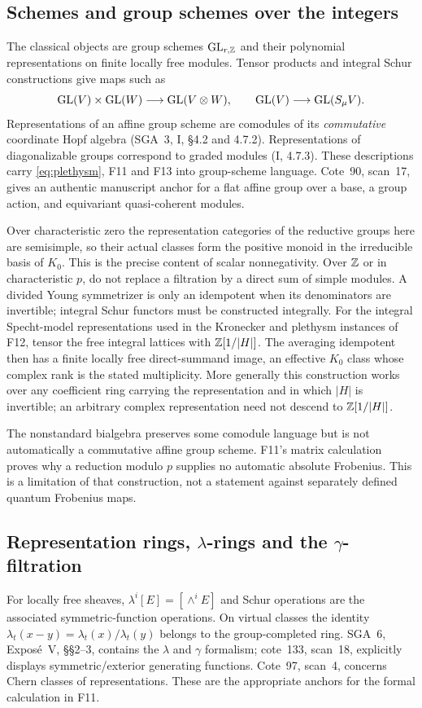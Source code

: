 \documentclass[11pt,a4paper]{article}
\newcommand{\fid}[1]{\textsf{#1}}\newcommand{\gate}[1]{\textsf{#1}}
\theoremstyle{named}\newtheorem{finding}{Finding}[section]
\theoremstyle{definition}\newtheorem{definition}[finding]{Definition}
\theoremstyle{remark}\newtheorem{remark}[finding]{Remark}
\begin{document}
\subsection{Schemes and group schemes over the integers}
The classical objects are group schemes $\mathrm{GL}_{r,\mathbb Z}$ and their polynomial representations on finite locally free modules. Tensor products and integral Schur constructions give maps such as
\[
 \mathrm{GL}(V)\times\mathrm{GL}(W)\longrightarrow\mathrm{GL}(V\otimes W),\qquad
 \mathrm{GL}(V)\longrightarrow\mathrm{GL}(S_\mu V).
\]
Representations of an affine group scheme are comodules of its \emph{commutative} coordinate Hopf algebra (SGA~3, I, \S4.2 and 4.7.2). Representations of diagonalizable groups correspond to graded modules (I, 4.7.3). These descriptions carry \eqref{eq:plethysm}, \fid{F11} and \fid{F13} into group-scheme language. Cote~90, scan~17, gives an authentic manuscript anchor for a flat affine group over a base, a group action, and equivariant quasi-coherent modules.

Over characteristic zero the representation categories of the reductive groups here are semisimple, so their actual classes form the positive monoid in the irreducible basis of $K_0$. This is the precise content of scalar nonnegativity. Over $\mathbb Z$ or in characteristic $p$, do not replace a filtration by a direct sum of simple modules. A divided Young symmetrizer is only an idempotent when its denominators are invertible; integral Schur functors must be constructed integrally. For the integral Specht-model representations used in the Kronecker and plethysm instances of \fid{F12}, tensor the free integral lattices with $\mathbb Z[1/|H|]$. The averaging idempotent then has a finite locally free direct-summand image, an effective $K_0$ class whose complex rank is the stated multiplicity. More generally this construction works over any coefficient ring carrying the representation and in which $|H|$ is invertible; an arbitrary complex representation need not descend to $\mathbb Z[1/|H|]$.

The nonstandard bialgebra preserves some comodule language but is not automatically a commutative affine group scheme. \fid{F11}'s matrix calculation proves why a reduction modulo $p$ supplies no automatic absolute Frobenius. This is a limitation of that construction, not a statement against separately defined quantum Frobenius maps.

\subsection{Representation rings, $\lambda$-rings and the $\gamma$-filtration}
For locally free sheaves, $\lambda^i[E]=[\wedge^iE]$ and Schur operations are the associated symmetric-function operations. On virtual classes the identity $\lambda_t(x-y)=\lambda_t(x)/\lambda_t(y)$ belongs to the group-completed ring. SGA~6, Expos\'e~V, \S\S2--3, contains the $\lambda$ and $\gamma$ formalism; cote~133, scan~18, explicitly displays symmetric/exterior generating functions. Cote~97, scan~4, concerns Chern classes of representations. These are the appropriate anchors for the formal calculation in \fid{F11}.
\end{document}
